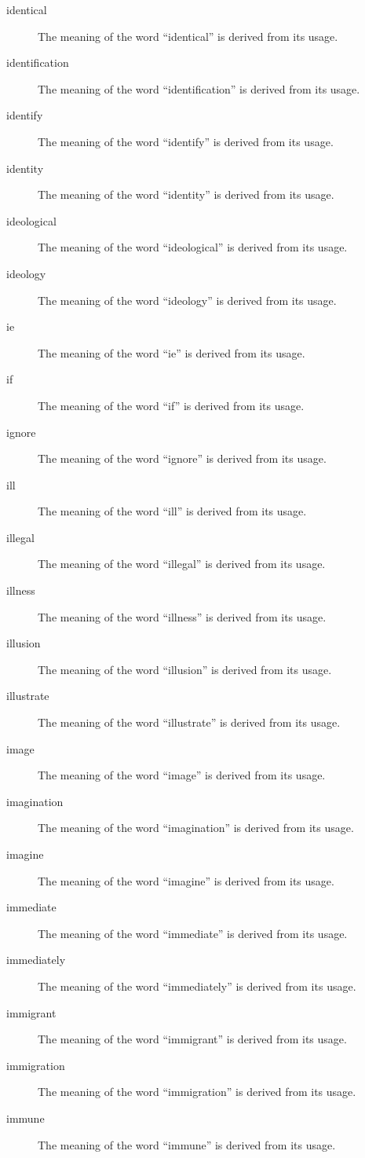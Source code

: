 \documentclass[12pt, letterpaper]{memoir}
\begin{document}
\begin{description}
\item[identical] The meaning of the word ``identical'' is derived from its usage.
\item[identification] The meaning of the word ``identification'' is derived from its usage.
\item[identify] The meaning of the word ``identify'' is derived from its usage.
\item[identity] The meaning of the word ``identity'' is derived from its usage.
\item[ideological] The meaning of the word ``ideological'' is derived from its usage.
\item[ideology] The meaning of the word ``ideology'' is derived from its usage.
\item[ie] The meaning of the word ``ie'' is derived from its usage.
\item[if] The meaning of the word ``if'' is derived from its usage.
\item[ignore] The meaning of the word ``ignore'' is derived from its usage.
\item[ill] The meaning of the word ``ill'' is derived from its usage.
\item[illegal] The meaning of the word ``illegal'' is derived from its usage.
\item[illness] The meaning of the word ``illness'' is derived from its usage.
\item[illusion] The meaning of the word ``illusion'' is derived from its usage.
\item[illustrate] The meaning of the word ``illustrate'' is derived from its usage.
\item[image] The meaning of the word ``image'' is derived from its usage.
\item[imagination] The meaning of the word ``imagination'' is derived from its usage.
\item[imagine] The meaning of the word ``imagine'' is derived from its usage.
\item[immediate] The meaning of the word ``immediate'' is derived from its usage.
\item[immediately] The meaning of the word ``immediately'' is derived from its usage.
\item[immigrant] The meaning of the word ``immigrant'' is derived from its usage.
\item[immigration] The meaning of the word ``immigration'' is derived from its usage.
\item[immune] The meaning of the word ``immune'' is derived from its usage.

\end{description}
\end{document}

